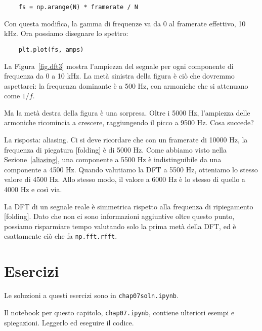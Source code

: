 \documentclass[12pt,a4paper]{book}
\begin{document}
\begin{verbatim} 
    fs = np.arange(N) * framerate / N
 \end{verbatim} 

Con questa modifica, la gamma di frequenze va da 0 al framerate effettivo, 10 kHz. Ora possiamo disegnare lo spettro:

\begin{verbatim} 
    plt.plot(fs, amps)
 \end{verbatim} 

La Figura~\ref{fig.dft3} mostra l'ampiezza del segnale per ogni componente di frequenza da 0 a 10 kHz. La metà sinistra della figura è ciò che dovremmo aspettarci: la frequenza dominante è a 500 Hz, con armoniche che si attenuano come $1/f$.

Ma la metà destra della figura è una sorpresa. Oltre i 5000 Hz, l'ampiezza delle armoniche ricomincia a crescere, raggiungendo il picco a 9500 Hz. Cosa succede?

La risposta: aliasing. Ci si deve ricordare che con un framerate di 10000 Hz, la frequenza di piegatura [folding] è di 5000 Hz. Come abbiamo visto nella Sezione~\ref{aliasing}, una componente a 5500 Hz è indistinguibile da una componente a 4500 Hz. Quando valutiamo la DFT a 5500 Hz, otteniamo lo stesso valore di 4500 Hz. Allo stesso modo, il valore a 6000 Hz è lo stesso di quello a 4000 Hz e così via.

La DFT di un segnale reale è simmetrica rispetto alla frequenza di ripiegamento [folding]. Dato che non ci sono informazioni aggiuntive oltre questo punto, possiamo risparmiare tempo valutando solo la prima metà della DFT, ed è esattamente ciò che fa {\tt np.fft.rfft}.

\section{Esercizi} 

Le soluzioni a questi esercizi sono in {\tt chap07soln.ipynb}.

\begin{exercise} Il notebook per questo capitolo, {\tt chap07.ipynb}, contiene ulteriori esempi e spiegazioni. Leggerlo ed eseguire il codice. \end{exercise} 
\end{document}
